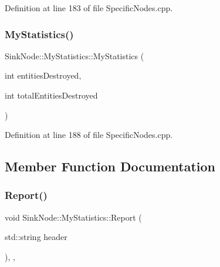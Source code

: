 Definition at line 183 of file Specific\+Nodes.\+cpp.

\mbox{\label{class_sink_node_1_1_my_statistics_af8352a16e20eab800737612436be103e}} 
\subsubsection{\texorpdfstring{My\+Statistics()}{MyStatistics()}\hspace{0.1cm}{\footnotesize\ttfamily [2/2]}}
{\footnotesize\ttfamily Sink\+Node\+::\+My\+Statistics\+::\+My\+Statistics (\begin{DoxyParamCaption}\item[{int}]{entities\+Destroyed,  }\item[{int}]{total\+Entities\+Destroyed }\end{DoxyParamCaption})\hspace{0.3cm}{\ttfamily [inline]}}



Definition at line 188 of file Specific\+Nodes.\+cpp.



\subsection{Member Function Documentation}
\mbox{\label{class_sink_node_1_1_my_statistics_acd304ae3a9892c9de454dc7ee36a942b}} 
\subsubsection{\texorpdfstring{Report()}{Report()}}
{\footnotesize\ttfamily void Sink\+Node\+::\+My\+Statistics\+::\+Report (\begin{DoxyParamCaption}\item[{std\+::string}]{header }\end{DoxyParamCaption})\hspace{0.3cm}{\ttfamily [inline]}, {\ttfamily [override]}, {\ttfamily [virtual]}}



